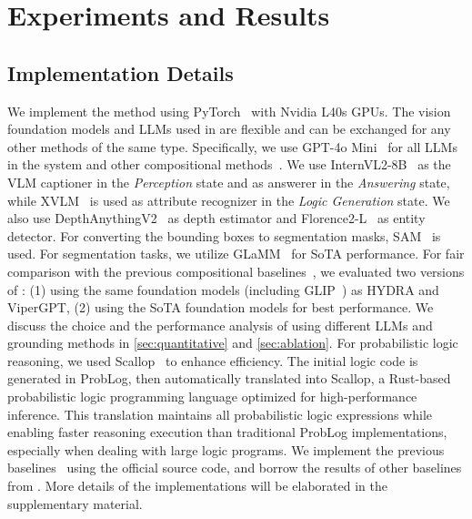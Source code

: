 \section{Experiments and Results}

\subsection{Implementation Details}

We implement the method using PyTorch~\cite{paszke_pytorch_2019} with Nvidia L40s GPUs. The vision foundation models and LLMs used in \methodname{} are flexible and can be exchanged for any other methods of the same type. Specifically, we use GPT-4o Mini~\cite{openai_gpt-4o_2024} for all LLMs in the system and other compositional methods~\cite{ke_hydra_2024, suris_vipergpt_2023}. We use InternVL2-8B~\cite{chen_internvl_2024} as the VLM captioner in the \emph{Perception} state and as answerer in the \emph{Answering} state, while XVLM~\cite{zeng_multi-grained_2022} is used as attribute recognizer in the \emph{Logic Generation} state. We also use DepthAnythingV2~\cite{yang_depth_2024} as depth estimator and Florence2-L~\cite{liu_grounding_2023} as entity detector. For converting the bounding boxes to segmentation masks, SAM~\cite{kirillov_segment_2023} is used.
For segmentation tasks, we utilize GLaMM~\cite{rasheed_glamm_2024} for SoTA performance. For fair comparison with the previous compositional baselines~\cite{ke_hydra_2024, suris_vipergpt_2023}, we evaluated two versions of \methodname{}: (1) using the same foundation models (including GLIP~\cite{li_grounded_2022}) as HYDRA and ViperGPT, (2) using  the SoTA foundation models for best performance. We discuss the choice and the performance analysis of using different LLMs and grounding methods in \autoref{sec:quantitative} and \autoref{sec:ablation}. 
For probabilistic logic reasoning, we used Scallop~\cite{li_scallop_2023} to enhance efficiency. The initial logic code is generated in ProbLog, then automatically translated into Scallop, a Rust-based probabilistic logic programming language optimized for high-performance inference. This translation maintains all probabilistic logic expressions while enabling faster reasoning execution than traditional ProbLog implementations, especially when dealing with large logic programs. 
We implement the previous baselines~\cite{ke_hydra_2024, suris_vipergpt_2023, li_grounded_2022, liu_grounding_2023, cheng_yolo-world_2024, kirillov_segment_2023, rasheed_glamm_2024, dai_simvg_2024, xiao_florence-2_2024} using the official source code, and borrow the results of other baselines from \cite{ke_hydra_2024, lai_lisa_2024, zhang_psalm_2024}. More details of the implementations will be elaborated in the supplementary material. 


